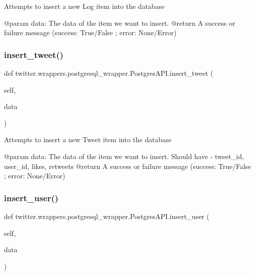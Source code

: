 \begin{DoxyVerb}Attempts to insert a new Log item into the database

@param data: The data of the item we want to insert.
@return A success or failure message ({success: True/False ; error: None/Error})
\end{DoxyVerb}
 \mbox{\label{classtwitter_1_1wrappers_1_1postgresql__wrapper_1_1PostgresAPI_a6b2b617a04ade9f12c63996210b2287b}} 
\subsubsection{\texorpdfstring{insert\+\_\+tweet()}{insert\_tweet()}}
{\footnotesize\ttfamily def twitter.\+wrappers.\+postgresql\+\_\+wrapper.\+Postgres\+A\+P\+I.\+insert\+\_\+tweet (\begin{DoxyParamCaption}\item[{}]{self,  }\item[{}]{data }\end{DoxyParamCaption})}

\begin{DoxyVerb}Attempts to insert a new Tweet item into the database

@param data: The data of the item we want to insert. Should have - tweet_id, user_id, likes, retweets
@return A success or failure message ({success: True/False ; error: None/Error})
\end{DoxyVerb}
 \mbox{\label{classtwitter_1_1wrappers_1_1postgresql__wrapper_1_1PostgresAPI_ae94da23c6824c6db14d62624eee98325}} 
\subsubsection{\texorpdfstring{insert\+\_\+user()}{insert\_user()}}
{\footnotesize\ttfamily def twitter.\+wrappers.\+postgresql\+\_\+wrapper.\+Postgres\+A\+P\+I.\+insert\+\_\+user (\begin{DoxyParamCaption}\item[{}]{self,  }\item[{}]{data }\end{DoxyParamCaption})}

